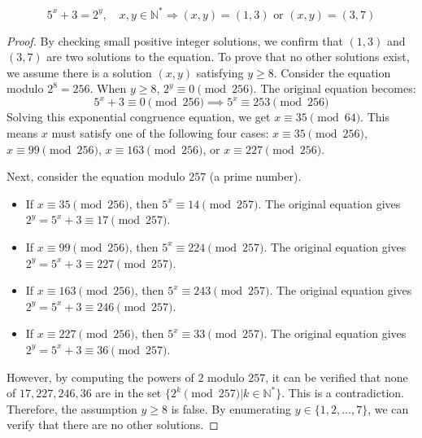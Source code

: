 \documentclass[10pt,a4paper]{amsart}
\begin{document}
\begin{proposition}
\[ 5^x+3=2^y, \quad x, y \in \mathbb{N}^* \Rightarrow (x,y)=(1,3) \text{ or } (x,y)=(3,7) \]
\end{proposition}

\begin{proof}
By checking small positive integer solutions, we confirm that $(1, 3)$ and $(3, 7)$ are two solutions to the equation. To prove that no other solutions exist, we assume there is a solution $(x, y)$ satisfying $y \ge 8$.
Consider the equation modulo $2^8=256$. When $y \ge 8$, $2^y \equiv 0 \pmod{256}$. The original equation becomes:
$$ 5^x+3 \equiv 0 \pmod{256} \implies 5^x \equiv 253 \pmod{256} $$
Solving this exponential congruence equation, we get $x \equiv 35 \pmod{64}$. This means $x$ must satisfy one of the following four cases: $x \equiv 35 \pmod{256}$, $x \equiv 99 \pmod{256}$, $x \equiv 163 \pmod{256}$, or $x \equiv 227 \pmod{256}$.

Next, consider the equation modulo $257$ (a prime number).
\begin{itemize}
    \item If $x \equiv 35 \pmod{256}$, then $5^x \equiv 14 \pmod{257}$. The original equation gives $2^y = 5^x+3 \equiv 17 \pmod{257}$.
    \item If $x \equiv 99 \pmod{256}$, then $5^x \equiv 224 \pmod{257}$. The original equation gives $2^y = 5^x+3 \equiv 227 \pmod{257}$.
    \item If $x \equiv 163 \pmod{256}$, then $5^x \equiv 243 \pmod{257}$. The original equation gives $2^y = 5^x+3 \equiv 246 \pmod{257}$.
    \item If $x \equiv 227 \pmod{256}$, then $5^x \equiv 33 \pmod{257}$. The original equation gives $2^y = 5^x+3 \equiv 36 \pmod{257}$.
\end{itemize}
However, by computing the powers of $2$ modulo $257$, it can be verified that none of $17, 227, 246, 36$ are in the set $\{2^k \pmod{257} | k \in \mathbb{N}^*\}$. This is a contradiction.
Therefore, the assumption $y \ge 8$ is false. By enumerating $y \in \{1, 2, \dots, 7\}$, we can verify that there are no other solutions.
\end{proof}
\end{document}
